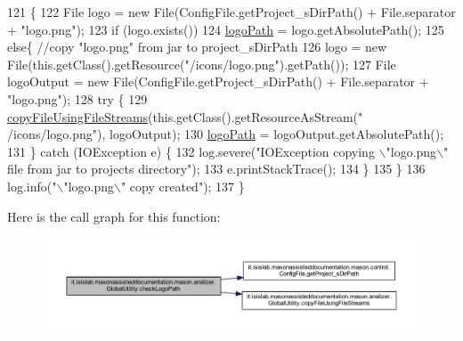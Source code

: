 \begin{DoxyCode}
121                                  \{
122         File logo = \textcolor{keyword}{new} File(ConfigFile.getProject\_sDirPath() + File.separator + \textcolor{stringliteral}{"logo.png"});
123         \textcolor{keywordflow}{if} (logo.exists())
124             \hyperlink{classit_1_1isislab_1_1masonassisteddocumentation_1_1mason_1_1analizer_1_1_global_utility_aeb806bda4a3b7b9099e2197bdca5cd75}{logoPath} = logo.getAbsolutePath();
125         \textcolor{keywordflow}{else}\{ \textcolor{comment}{//copy "logo.png" from jar to project\_sDirPath}
126             logo = \textcolor{keyword}{new} File(this.getClass().getResource(\textcolor{stringliteral}{"/icons/logo.png"}).getPath());
127             File logoOutput = \textcolor{keyword}{new} File(ConfigFile.getProject\_sDirPath() + File.separator + \textcolor{stringliteral}{"logo.png"});
128             \textcolor{keywordflow}{try} \{
129                 \hyperlink{classit_1_1isislab_1_1masonassisteddocumentation_1_1mason_1_1analizer_1_1_global_utility_adb83aee7a7166b3826c7f3cf4ada53a9}{copyFileUsingFileStreams}(this.getClass().getResourceAsStream(\textcolor{stringliteral}{"
      /icons/logo.png"}), logoOutput);
130                 \hyperlink{classit_1_1isislab_1_1masonassisteddocumentation_1_1mason_1_1analizer_1_1_global_utility_aeb806bda4a3b7b9099e2197bdca5cd75}{logoPath} = logoOutput.getAbsolutePath();
131             \} \textcolor{keywordflow}{catch} (IOException e) \{
132                 log.severe(\textcolor{stringliteral}{"IOException copying \(\backslash\)"logo.png\(\backslash\)" file from jar to projects directory"});
133                 e.printStackTrace();
134             \}
135         \}
136         log.info(\textcolor{stringliteral}{"\(\backslash\)"logo.png\(\backslash\)" copy created"});
137     \}
\end{DoxyCode}


Here is the call graph for this function\-:
\nopagebreak
\begin{figure}[H]
\begin{center}
\leavevmode
\includegraphics[width=350pt]{classit_1_1isislab_1_1masonassisteddocumentation_1_1mason_1_1analizer_1_1_global_utility_a66a1a8d4779245f596a65fd8d95362b2_cgraph}
\end{center}
\end{figure}




